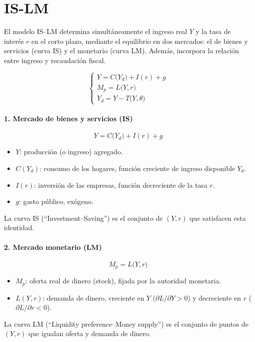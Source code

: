 \documentclass{article}
\begin{document}
\newpage
\section{IS-LM}







El modelo IS–LM determina simultáneamente el ingreso real \(Y\) y la tasa de interés \(r\) en el corto plazo, mediante el equilibrio en dos mercados: el de bienes y servicios (curva IS) y el monetario (curva LM). Además, incorpora la relación entre ingreso y recaudación fiscal.

\[
\begin{cases}
Y = C\bigl(Y_d\bigr) + I(r) + g\\[6pt]
M_p = L\bigl(Y,r\bigr)\\[6pt]
Y_d = Y - T\bigl(Y,\theta\bigr)
\end{cases}
\]

\bigskip

\paragraph{1. Mercado de bienes y servicios (IS)}  
\[
Y = C\bigl(Y_d\bigr) + I(r) + g
\]
\begin{itemize}
  \item \(Y\): producción (o ingreso) agregado.
  \item \(C(Y_d)\): consumo de los hogares, función creciente de ingreso disponible \(Y_d\).
  \item \(I(r)\): inversión de las empresas, función decreciente de la tasa \(r\).
  \item \(g\): gasto público, exógeno.
\end{itemize}
La curva IS (“Investment–Saving”) es el conjunto de \((Y,r)\) que satisfacen esta identidad. 
\bigskip

\paragraph{2. Mercado monetario (LM)}  
\[
M_p = L\bigl(Y,r\bigr)
\]
\begin{itemize}
  \item \(M_p\): oferta real de dinero (stock), fijada por la autoridad monetaria.
  \item \(L(Y,r)\): demanda de dinero, creciente en \(Y\) (\(\partial L/\partial Y>0\)) y decreciente en \(r\) (\(\partial L/\partial r<0\)).
\end{itemize}
La curva LM (“Liquidity preference–Money supply”) es el conjunto de puntos de \((Y,r)\) que igualan oferta y demanda de dinero. 
\end{document}
